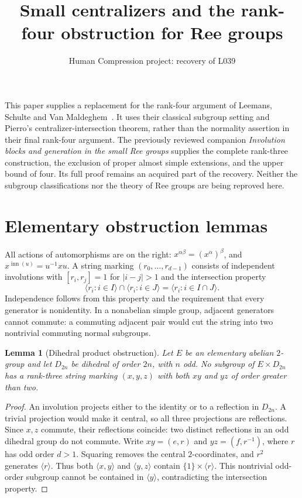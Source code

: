 \documentclass[11pt,a4paper]{article}
\title{Small centralizers and the rank-four obstruction for Ree groups}
\author{Human Compression project: recovery of L039}
\date{}
\newtheorem{lemma}{Lemma}
\newcommand{\gen}[1]{\langle #1\rangle}
\begin{document}
\maketitle
This paper supplies a replacement for the rank-four argument of
Leemans, Schulte and Van Maldeghem~\cite{LSV}. It uses their classical
subgroup setting and Pierro's centralizer-intersection theorem, rather
than the normality assertion in their final rank-four argument.
The previously reviewed companion \emph{Involution blocks and generation
in the small Ree groups} supplies the complete rank-three construction,
the exclusion of proper almost simple extensions, and the upper bound
of four. Its full proof remains an acquired part of the recovery.
Neither the subgroup classifications nor the theory of Ree groups are
being reproved here.

\section{Elementary obstruction lemmas}
All actions of automorphisms are on the right: $x^{\alpha\beta}
=(x^\alpha)^\beta$, and $x^{\operatorname{inn}(u)}=u^{-1}xu$.
A string marking $(r_0,\ldots,r_{d-1})$ consists of independent
involutions with $[r_i,r_j]=1$ for $|i-j|>1$ and the intersection
property
\[
 \gen{r_i:i\in I}\cap\gen{r_i:i\in J}
 =\gen{r_i:i\in I\cap J}.
\]
Independence follows from this property and the requirement that every
generator is nonidentity. In a nonabelian simple group, adjacent
generators cannot commute: a commuting adjacent pair would cut the
string into two nontrivial commuting normal subgroups.

\begin{lemma}[Dihedral product obstruction]\label{dihedral}
Let $E$ be an elementary abelian $2$-group and let $D_{2n}$ be dihedral
of order $2n$, with $n$ odd. No subgroup of $E\times D_{2n}$ has a
rank-three string marking $(x,y,z)$ with both $xy$ and $yz$ of order
greater than two.
\end{lemma}
\begin{proof}
An involution projects either to the identity or to a reflection in
$D_{2n}$. A trivial projection would make it central, so all three
projections are reflections. Since $x,z$ commute, their reflections
coincide: two distinct reflections in an odd dihedral group do not
commute. Write $xy=(e,r)$ and $yz=(f,r^{-1})$, where $r$ has odd order
$d>1$. Squaring removes the central $2$-coordinates, and $r^2$ generates
$\gen r$. Thus both $\gen{x,y}$ and $\gen{y,z}$ contain
$\{1\}\times\gen r$. This nontrivial odd-order subgroup cannot be
contained in $\gen y$, contradicting the intersection property.
\end{proof}
\end{document}
